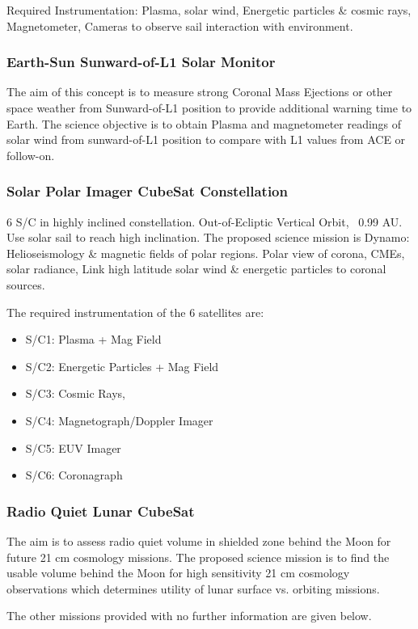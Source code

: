 Required Instrumentation: Plasma, solar wind, Energetic particles \& cosmic rays, Magnetometer, Cameras to observe sail interaction with environment.

\subsubsection{Earth-Sun Sunward-of-L1 Solar Monitor}
The aim of this concept is to measure strong Coronal Mass Ejections or other space weather from Sunward-of-L1 position to provide additional warning time to Earth. The science objective is to obtain Plasma and magnetometer readings of solar wind from sunward-of-L1 position to compare with L1 values from ACE or follow-on.

\subsubsection{Solar Polar Imager CubeSat Constellation}
6 S/C in highly inclined constellation. Out-of-Ecliptic Vertical Orbit, ~0.99 AU. Use solar sail to reach high inclination. The proposed science mission is Dynamo: Helioseismology \& magnetic fields of polar regions. 
Polar view of corona, CMEs, solar radiance, Link high latitude solar wind \& energetic particles to coronal sources. 

The required instrumentation of the 6  satellites are:
\begin{itemize}
\item S/C1: Plasma + Mag Field 
\item S/C2: Energetic Particles + Mag Field 
\item S/C3: Cosmic Rays, 
\item S/C4: Magnetograph/Doppler Imager 
\item S/C5: EUV Imager 
\item S/C6: Coronagraph 
\end{itemize}

\subsubsection{Radio Quiet Lunar CubeSat}
The aim is to assess radio quiet volume in shielded zone behind the Moon for future 21 cm cosmology missions. The proposed science mission is to find the usable volume behind the Moon for high sensitivity 21 cm cosmology observations which determines utility of lunar surface vs. orbiting missions. 

The other missions provided with no further information are given below. 

